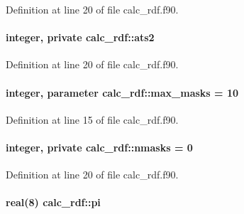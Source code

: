 Definition at line 20 of file calc\-\_\-rdf.\-f90.

\hypertarget{classcalc__rdf_a739daf79adfedac15e00f766e326d428}{
\paragraph[{ats2}]{\setlength{\rightskip}{0pt plus 5cm}integer, private calc\-\_\-rdf\-::ats2\hspace{0.3cm}{\ttfamily [private]}}}\label{classcalc__rdf_a739daf79adfedac15e00f766e326d428}


Definition at line 20 of file calc\-\_\-rdf.\-f90.

\hypertarget{classcalc__rdf_ab5e39e9764e56704c253909fa016a1b3}{
\paragraph[{max\-\_\-masks}]{\setlength{\rightskip}{0pt plus 5cm}integer, parameter calc\-\_\-rdf\-::max\-\_\-masks = 10}}\label{classcalc__rdf_ab5e39e9764e56704c253909fa016a1b3}


Definition at line 15 of file calc\-\_\-rdf.\-f90.

\hypertarget{classcalc__rdf_ae2331cc70b27b0a47bb30369de28622b}{
\paragraph[{nmasks}]{\setlength{\rightskip}{0pt plus 5cm}integer, private calc\-\_\-rdf\-::nmasks = 0\hspace{0.3cm}{\ttfamily [private]}}}\label{classcalc__rdf_ae2331cc70b27b0a47bb30369de28622b}


Definition at line 20 of file calc\-\_\-rdf.\-f90.

\hypertarget{classcalc__rdf_aa3ae710f9cac6076af7157a2cfd376fc}{
\paragraph[{pi}]{\setlength{\rightskip}{0pt plus 5cm}real(8) calc\-\_\-rdf\-::pi}}\label{classcalc__rdf_aa3ae710f9cac6076af7157a2cfd376fc}


